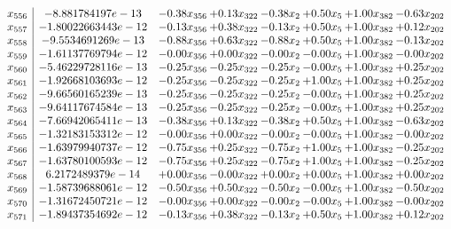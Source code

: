 \documentclass[8pt]{article}
\begin{document}
\[\begin{array}{c| c c@{\hskip 2pt} c@{\hskip 2pt} c@{\hskip 2pt} c@{\hskip 2pt} c@{\hskip 2pt} c@{\hskip 2pt} }
 x_{556}   &  -8.881784197e-13 & -0.38 x_{356} & +  0.13 x_{322} & -0.38 x_{2} & +  0.50 x_{5} & +  1.00 x_{382} & -0.63 x_{202}\\
 x_{557}   &  -1.80022663443e-12 & -0.13 x_{356} & +  0.38 x_{322} & -0.13 x_{2} & +  0.50 x_{5} & +  1.00 x_{382} & +  0.12 x_{202}\\
 x_{558}   &  -9.5534691269e-13 & -0.88 x_{356} & +  0.63 x_{322} & -0.88 x_{2} & +  0.50 x_{5} & +  1.00 x_{382} & -0.13 x_{202}\\
 x_{559}   &  -1.61137769794e-12 & -0.00 x_{356} & +  0.00 x_{322} & -0.00 x_{2} & -0.00 x_{5} & +  1.00 x_{382} & -0.00 x_{202}\\
 x_{560}   &  -5.46229728116e-13 & -0.25 x_{356} & -0.25 x_{322} & -0.25 x_{2} & -0.00 x_{5} & +  1.00 x_{382} & +  0.25 x_{202}\\
 x_{561}   &  -1.92668103693e-12 & -0.25 x_{356} & -0.25 x_{322} & -0.25 x_{2} & +  1.00 x_{5} & +  1.00 x_{382} & +  0.25 x_{202}\\
 x_{562}   &  -9.66560165239e-13 & -0.25 x_{356} & -0.25 x_{322} & -0.25 x_{2} & -0.00 x_{5} & +  1.00 x_{382} & +  0.25 x_{202}\\
 x_{563}   &  -9.64117674584e-13 & -0.25 x_{356} & -0.25 x_{322} & -0.25 x_{2} & -0.00 x_{5} & +  1.00 x_{382} & +  0.25 x_{202}\\
 x_{564}   &  -7.66942065411e-13 & -0.38 x_{356} & +  0.13 x_{322} & -0.38 x_{2} & +  0.50 x_{5} & +  1.00 x_{382} & -0.63 x_{202}\\
 x_{565}   &  -1.32183153312e-12 & -0.00 x_{356} & +  0.00 x_{322} & -0.00 x_{2} & -0.00 x_{5} & +  1.00 x_{382} & -0.00 x_{202}\\
 x_{566}   &  -1.63979940737e-12 & -0.75 x_{356} & +  0.25 x_{322} & -0.75 x_{2} & +  1.00 x_{5} & +  1.00 x_{382} & -0.25 x_{202}\\
 x_{567}   &  -1.63780100593e-12 & -0.75 x_{356} & +  0.25 x_{322} & -0.75 x_{2} & +  1.00 x_{5} & +  1.00 x_{382} & -0.25 x_{202}\\
 x_{568}   &  6.2172489379e-14 & +  0.00 x_{356} & -0.00 x_{322} & +  0.00 x_{2} & +  0.00 x_{5} & +  1.00 x_{382} & +  0.00 x_{202}\\
 x_{569}   &  -1.58739688061e-12 & -0.50 x_{356} & +  0.50 x_{322} & -0.50 x_{2} & -0.00 x_{5} & +  1.00 x_{382} & -0.50 x_{202}\\
 x_{570}   &  -1.31672450721e-12 & -0.00 x_{356} & +  0.00 x_{322} & -0.00 x_{2} & -0.00 x_{5} & +  1.00 x_{382} & -0.00 x_{202}\\
 x_{571}   &  -1.89437354692e-12 & -0.13 x_{356} & +  0.38 x_{322} & -0.13 x_{2} & +  0.50 x_{5} & +  1.00 x_{382} & +  0.12 x_{202}\\

\end{array}\]
\end{document}
